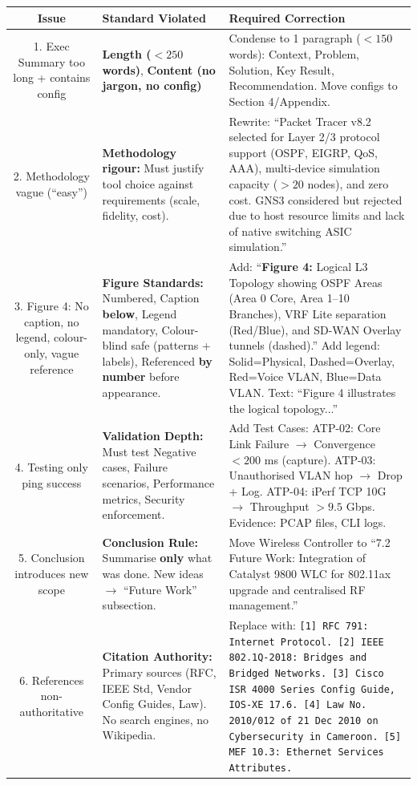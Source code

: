 \documentclass[11pt]{article}
\begin{document}
\begin{exoresolu}
\begin{center}
\begin{tabularx}{\linewidth}{|c|X|X|}
\hline
\rowcolor{popblueL}
\textbf{Issue} & \textbf{Standard Violated} & \textbf{Required Correction} \\
\hline
1. Exec Summary too long + contains config & \textbf{Length ($<250$ words)}, \textbf{Content (no jargon, no config)} & Condense to 1 paragraph ($< 150$ words): Context, Problem, Solution, Key Result, Recommendation. Move configs to Section 4/Appendix. \\
\hline
2. Methodology vague (``easy'') & \textbf{Methodology rigour:} Must justify tool choice against requirements (scale, fidelity, cost). & Rewrite: ``Packet Tracer v8.2 selected for Layer 2/3 protocol support (OSPF, EIGRP, QoS, AAA), multi-device simulation capacity ($> 20$ nodes), and zero cost. GNS3 considered but rejected due to host resource limits and lack of native switching ASIC simulation.'' \\
\hline
3. Figure 4: No caption, no legend, colour-only, vague reference & \textbf{Figure Standards:} Numbered, Caption \textbf{below}, Legend mandatory, Colour-blind safe (patterns + labels), Referenced \textbf{by number} before appearance. & Add: ``\textbf{Figure 4:} Logical L3 Topology showing OSPF Areas (Area 0 Core, Area 1--10 Branches), VRF Lite separation (Red/Blue), and SD-WAN Overlay tunnels (dashed).'' Add legend: Solid=Physical, Dashed=Overlay, Red=Voice VLAN, Blue=Data VLAN. Text: ``Figure 4 illustrates the logical topology...'' \\
\hline
4. Testing only ping success & \textbf{Validation Depth:} Must test Negative cases, Failure scenarios, Performance metrics, Security enforcement. & Add Test Cases: ATP-02: Core Link Failure $\rightarrow$ Convergence $< 200$ ms (capture). ATP-03: Unauthorised VLAN hop $\rightarrow$ Drop + Log. ATP-04: iPerf TCP 10G $\rightarrow$ Throughput $> 9.5$ Gbps. Evidence: PCAP files, CLI logs. \\
\hline
5. Conclusion introduces new scope & \textbf{Conclusion Rule:} Summarise \textbf{only} what was done. New ideas $\rightarrow$ ``Future Work'' subsection. & Move Wireless Controller to ``7.2 Future Work: Integration of Catalyst 9800 WLC for 802.11ax upgrade and centralised RF management.'' \\
\hline
6. References non-authoritative & \textbf{Citation Authority:} Primary sources (RFC, IEEE Std, Vendor Config Guides, Law). No search engines, no Wikipedia. & Replace with: \texttt{[1] RFC 791: Internet Protocol. [2] IEEE 802.1Q-2018: Bridges and Bridged Networks. [3] Cisco ISR 4000 Series Config Guide, IOS-XE 17.6. [4] Law No. 2010/012 of 21 Dec 2010 on Cybersecurity in Cameroon. [5] MEF 10.3: Ethernet Services Attributes.} \\
\hline
\end{tabularx}
\end{center}


\end{exoresolu}
\end{document}
